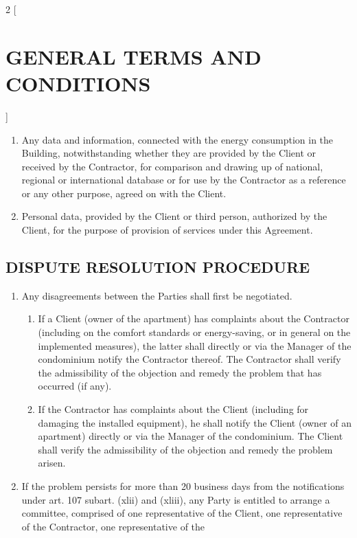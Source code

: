 \begin{multicols}{2} [\section{GENERAL TERMS AND CONDITIONS}]
\begin{enumerate}
\begin{enumerate}
        \item Any data and information, connected with the energy
          consumption in the Building, notwithstanding whether they
          are provided by the Client or received by the Contractor,
          for comparison and drawing up of national, regional or
          international database or for use by the Contractor as a
          reference or any other purpose, agreed on with the Client.
        \item Personal data, provided by the Client or third person,
          authorized by the Client, for the purpose of provision of
          services under this Agreement.
        \end{enumerate}
      \end{enumerate}

      \subsection{DISPUTE RESOLUTION PROCEDURE}
      \begin{enumerate}
      \item Any disagreements between the Parties shall first be
        negotiated.
        \begin{enumerate}
        \item If a Client (owner of the apartment) has complaints
          about the Contractor (including on the comfort standards or
          energy-saving, or in general on the implemented measures),
          the latter shall directly or via the Manager of the
          condominium notify the Contractor thereof. The Contractor
          shall verify the admissibility of the objection and remedy
          the problem that has occurred (if any).
        \item If the Contractor has complaints about the Client
          (including for damaging the installed equipment), he shall
          notify the Client (owner of an apartment) directly or via
          the Manager of the condominium. The Client shall verify the
          admissibility of the objection and remedy the problem
          arisen.
        \end{enumerate}
      \item If the problem persists for more than 20 business days
        from the notifications under art. 107 subart. (xlii) and
        (xliii), any Party is entitled to arrange a committee,
        comprised of one representative of the Client, one
        representative of the Contractor, one representative of the

\end{enumerate}
\end{multicols}
